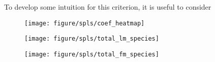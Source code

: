 \documentclass{article}
\begin{document}
To develop some intuition for this criterion, it is useful to consider


\begin{figure}[ht]
  \centering
  \texttt{[image: figure/spls/coef\_heatmap]}
  \caption{\label{fig:spls_coef_heatmap} }
\end{figure}

\begin{figure}[ht]
  \centering
  \texttt{[image: figure/spls/total\_lm\_species]}
  \caption{\label{fig:spls_total_lm_species} }
\end{figure}

\begin{figure}[ht]
  \centering
  \texttt{[image: figure/spls/total\_fm\_species]}
  \caption{\label{fig:spls_total_fm_species} }
\end{figure}


\end{document}
